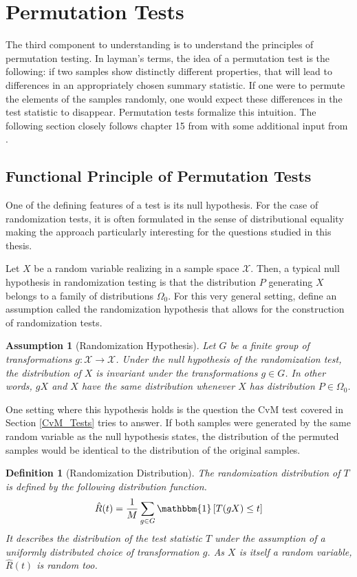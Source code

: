 \documentclass[12pt, a4paper]{article}
\theoremstyle{MAstyle} \newtheorem{assumption}{Assumption}[section]
\theoremstyle{MAstyle} \newtheorem{definition}{Definition}[section]
\theoremstyle{MAstyle} \newtheorem{theorem}{Theorem}[section]
\begin{document}
	\section{Permutation Tests}\label{Permutation_Tests}
		The third component to understanding \cite{bugni_permutation_2021} is to understand the principles of permutation testing.
		In layman's terms, the idea of a permutation test is the following: if two samples show distinctly different properties, that will lead to differences in an appropriately chosen summary statistic. If one were to permute the elements of the samples randomly, one would expect these differences in the test statistic to disappear.
		Permutation tests formalize this intuition. The following section closely follows chapter 15 from \cite{lehmann_testing_2005} with some additional input from \cite{van_der_vaart_weak_1996}.
	
		\subsection{Functional Principle of Permutation Tests}
			One of the defining features of a test is its null hypothesis. For the case of randomization tests, it is often formulated in the sense of distributional equality making the approach particularly interesting for the questions studied in this thesis. 
			
			Let $X$ be a random variable realizing in a sample space $\mathcal{X}$. Then, a typical null hypothesis in randomization testing is that the distribution $P$ generating $X$ belongs to a family of distributions $\Omega_0$. For this very general setting, \cite{lehmann_testing_2005} define an assumption called the randomization hypothesis that allows for the construction of randomization tests.
			\begin{assumption}[Randomization Hypothesis]\label{rand_hypo}
				 Let $G$ be a finite group of transformations $g: \mathcal{X} \rightarrow \mathcal{X}$. Under the null hypothesis of the randomization test, the distribution of $X$ is invariant under the transformations $g \in G$. In other words, $gX$ and $X$ have the same distribution whenever $X$ has distribution $P \in \Omega_0$.
			\end{assumption}
			One setting where this hypothesis holds is the question the CvM test covered in Section \ref{CvM_Tests} tries to answer. If both samples were generated by the same random variable as the null hypothesis states, the distribution of the permuted samples would be identical to the distribution of the original samples.
			\begin{definition}[Randomization Distribution]\label{rand_dist}
				The randomization distribution of $T$ is defined by the following distribution function.
				$$\hat{R}(t) = \frac{1}{M} \sum_{g \in G} \mathbbm{1} \left[T(gX) \leq t\right]$$
				It describes the distribution of the test statistic $T$ under the assumption of a uniformly distributed choice of transformation $g$. As $X$ is itself a random variable, $\hat{R}(t)$ is random too.
			\end{definition}
			
\end{document}
